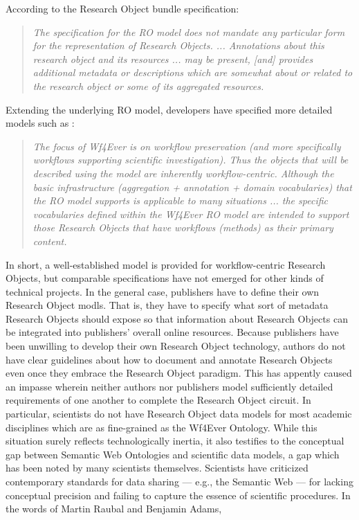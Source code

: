 \documentclass[10pt,letterpaper]{article}
\begin{document}
According to the Research Object bundle specification: 

\begin{quote}{\textit{The specification for the RO model does not mandate any 
particular form for the representation of Research Objects. 
... Annotations about this research object and its resources ... 
may be present, [and] provides additional metadata or descriptions 
which are somewhat about or related to the research object or some 
of its aggregated resources.}}
\end{quote}

Extending the underlying RO model, developers have 
specified more detailed models such as :

\begin{quote}{\textit{The focus of Wf4Ever is on workflow preservation 
(and more specifically workflows supporting scientific investigation). 
Thus the objects that will be described using the model are inherently 
workflow-centric.  Although the basic infrastructure 
(aggregation + annotation + domain vocabularies) that the RO model supports 
is applicable to many situations ...  
the specific vocabularies defined within the Wf4Ever RO model are 
intended to support those Research Objects that 
have workflows (methods) as their primary content.}}
\end{quote}

In short, a well-established model is provided for workflow-centric 
Research Objects, but comparable specifications have not 
emerged for other kinds of technical projects.  In the general 
case, publishers have to define their own Research Object 
modls.  That is, they have to specify what sort of 
metadata Research Objects should expose so that 
information about Research Objects can be integrated 
into publishers' overall online resources.  
\p{}
Because publishers have been unwilling to develop their own 
Research Object technology, authors do not have clear 
guidelines about how to document and annotate Research Objects 
even once they embrace the Research Object paradigm.  
This has appently caused an impasse wherein 
neither authors nor publishers model sufficiently detailed 
requirements of one another to complete the Research Object 
circuit.  In particular, scientists do not have 
Research Object data models for most academic disciplines 
which are as fine-grained as the Wf4Ever Ontology.  
While this situation surely reflects technologically 
inertia, it also testifies to the conceptual gap between 
Semantic Web Ontologies and scientific data models, a gap 
which has been noted by many scientists themselves.  
\p{}
Scientists have criticized contemporary standards for data sharing 
--- e.g., the Semantic Web --- for lacking conceptual precision 
and failing to capture the essence of scientific 
procedures.  In the words of 
Martin Raubal and Benjamin Adams,
\end{document}
